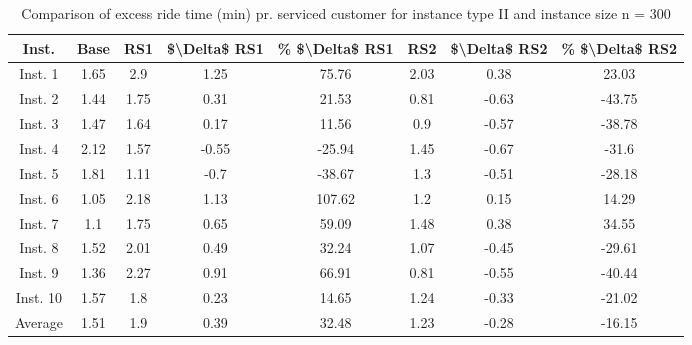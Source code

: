 \begin{table}[H]
\centering
\begin{tabular}{cccccccc}
  \hline
  \textbf{Inst.} & \textbf{Base} & \textbf{RS1} & \textbf{\$\textbackslash{}Delta\$  RS1} & \textbf{\% \$\textbackslash{}Delta\$  RS1} & \textbf{RS2} & \textbf{\$\textbackslash{}Delta\$  RS2} & \textbf{\% \$\textbackslash{}Delta\$  RS2} \\\hline
  Inst. 1 & 1.65 & 2.9 & 1.25 & 75.76 & 2.03 & 0.38 & 23.03 \\
  Inst. 2 & 1.44 & 1.75 & 0.31 & 21.53 & 0.81 & -0.63 & -43.75 \\
  Inst. 3 & 1.47 & 1.64 & 0.17 & 11.56 & 0.9 & -0.57 & -38.78 \\
  Inst. 4 & 2.12 & 1.57 & -0.55 & -25.94 & 1.45 & -0.67 & -31.6 \\
  Inst. 5 & 1.81 & 1.11 & -0.7 & -38.67 & 1.3 & -0.51 & -28.18 \\
  Inst. 6 & 1.05 & 2.18 & 1.13 & 107.62 & 1.2 & 0.15 & 14.29 \\
  Inst. 7 & 1.1 & 1.75 & 0.65 & 59.09 & 1.48 & 0.38 & 34.55 \\
  Inst. 8 & 1.52 & 2.01 & 0.49 & 32.24 & 1.07 & -0.45 & -29.61 \\
  Inst. 9 & 1.36 & 2.27 & 0.91 & 66.91 & 0.81 & -0.55 & -40.44 \\
  Inst. 10 & 1.57 & 1.8 & 0.23 & 14.65 & 1.24 & -0.33 & -21.02 \\
  Average & 1.51 & 1.9 & 0.39 & 32.48 & 1.23 & -0.28 & -16.15 \\\hline
\end{tabular}
\caption{Comparison of excess ride time (min) pr. serviced customer for instance type II and instance size n = 300}
\label{tab:wait:resrelocation-excess-ride-time-comparison_II_300}
\end{table}

